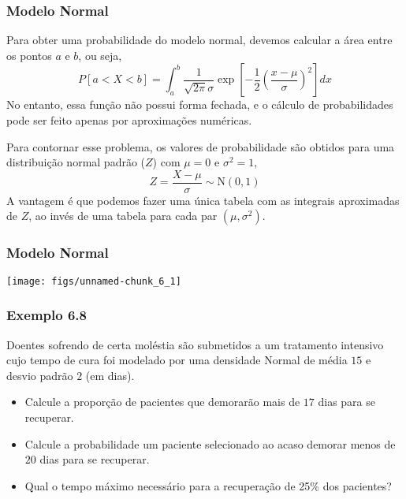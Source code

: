 \documentclass[11pt]{beamer}
\begin{document}
\begin{frame}
\frametitle{Modelo Normal}

Para obter uma probabilidade do modelo normal, devemos calcular a área
entre os pontos \(a\) e \(b\), ou seja, \[
P[a < X < b] = \int_a^b \frac{1}{\sqrt{2\pi}\sigma} \exp\left[-\frac{1}{2}
\left( \frac{x - \mu}{\sigma}\right)^2\right] dx
\] No entanto, essa função não possui forma fechada, e o cálculo de
probabilidades pode ser feito apenas por aproximações numéricas.

Para contornar esse problema, os valores de probabilidade são obtidos
para uma distribuição normal padrão (\(Z\)) com \(\mu = 0\) e
\(\sigma^2 = 1\), \[
Z = \frac{X - \mu}{\sigma} \sim \text{N}(0,1)
\] A vantagem é que podemos fazer uma única tabela com as integrais
aproximadas de \(Z\), ao invés de uma tabela para cada par
\((\mu,\sigma^2)\).
\end{frame}

\begin{frame}
\frametitle{Modelo Normal}

\begin{center}\texttt{[image: figs/unnamed-chunk\_6\_1]} \end{center}
\end{frame}


\begin{frame}
\frametitle{Exemplo 6.8}

Doentes sofrendo de certa moléstia são submetidos a um tratamento
intensivo cujo tempo de cura foi modelado por uma densidade Normal de
média \(15\) e desvio padrão \(2\) (em dias).

\begin{itemize}
\item
  Calcule a proporção de pacientes que demorarão mais de \(17\) dias
  para se recuperar.
\item
  Calcule a probabilidade um paciente selecionado ao acaso demorar menos
  de \(20\) dias para se recuperar.
\item
  Qual o tempo máximo necessário para a recuperação de 25\% dos
  pacientes?

\end{itemize}
\end{frame}
\end{document}

